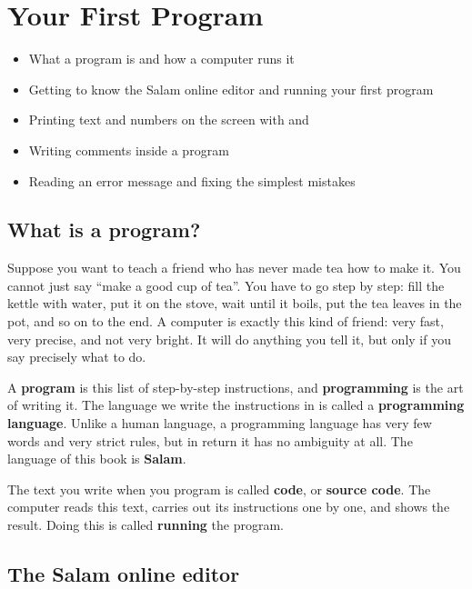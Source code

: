 \chapter{Your First Program}\label{ch:first}

\begin{goals}
\begin{itemize}
  \item What a program is and how a computer runs it
  \item Getting to know the Salam online editor and running your first program
  \item Printing text and numbers on the screen with  and 
  \item Writing comments inside a program
  \item Reading an error message and fixing the simplest mistakes
\end{itemize}
\end{goals}

\section{What is a program?}

Suppose you want to teach a friend who has never made tea how to make it.
You cannot just say ``make a good cup of tea''. You have to go step by step:
fill the kettle with water, put it on the stove, wait until it boils, put the
tea leaves in the pot, and so on to the end. A computer is exactly this kind
of friend: very fast, very precise, and not very bright. It will do anything
you tell it, but only if you say precisely what to do.

A \textbf{program} is this list of step-by-step instructions, and
\textbf{programming} is the art of writing it. The language we write the
instructions in is called a \textbf{programming language}. Unlike a human
language, a programming language has very few words and very strict rules,
but in return it has no ambiguity at all. The language of this book is
\textbf{Salam}.

\begin{note}
The text you write when you program is called \textbf{code}, or
\textbf{source code}. The computer reads this text, carries out its
instructions one by one, and shows the result. Doing this is called
\textbf{running} the program.
\end{note}

\section{The Salam online editor}

